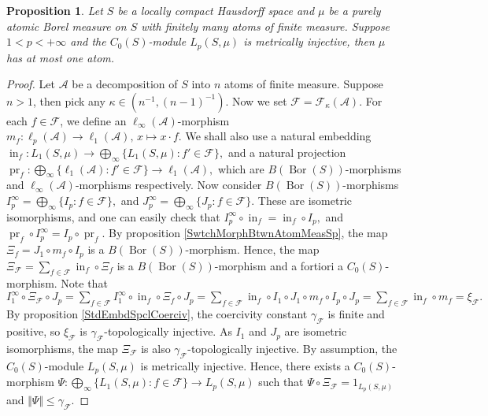 \documentclass[12pt]{article}
\newtheorem{proposition}[theorem]{Proposition}
\begin{document}
\begin{proposition}\label{MetInjC0SModLpSmuOnFinAtmMeasSpCharac}
    Let $S$ be a locally compact Hausdorff space and $\mu$ be a purely atomic 
    Borel measure on $S$ with finitely many atoms of finite measure. 
    Suppose $1<p<+\infty$ and the $C_0(S)$-module $L_p(S,\mu)$ is metrically 
    injective, then $\mu$ has at most one atom.
\end{proposition}
\begin{proof}
    Let $\mathcal{A}$ be a decomposition of $S$ into $n$ atoms of finite 
    measure. Suppose $n>1$, then pick any $\kappa\in(n^{-1}, (n-1)^{-1})$. 
    Now we set $\mathcal{F}=\mathcal{F}_{\kappa}(\mathcal{A})$. For 
    each $f\in \mathcal{F}$, we define an $\ell_\infty(\mathcal{A})$-morphism 
    $
        m_f:
        \ell_p(\mathcal{A})\to\ell_1(\mathcal{A}),\,
        x\mapsto x\cdot f.
    $
    We shall also use a natural embedding 
    $
        \operatorname{in}_f:
        L_1(S,\mu)\to\bigoplus_\infty\{L_1(S,\mu):f'\in\mathcal{F}\},
    $
    and a natural projection
    $
        \operatorname{pr}_f:
        \bigoplus_\infty\{
            \ell_1(\mathcal{A}):f'\in\mathcal{F}
        \}\to\ell_1(\mathcal{A}),
    $
    which are $B(\operatorname{Bor}(S))$-morphisms 
    and $\ell_\infty(\mathcal{A})$-morphisms respectively. 
    Now consider $B(\operatorname{Bor}(S))$-morphisms 
    $
        I_p^\infty=\bigoplus_\infty\{I_p:f\in\mathcal{F}\},
    $
    and
    $
        J_p^\infty=\bigoplus_\infty\{J_p:f\in\mathcal{F}\}.
    $
    These are isometric isomorphisms, and one can easily check that 
    $
        I_p^\infty \circ \operatorname{in}_f=\operatorname{in}_f\circ I_p,
    $
    and
    $
        \operatorname{pr}_f\circ I_p^\infty=I_p\circ \operatorname{pr}_f.
    $
    By proposition \ref{SwtchMorphBtwnAtomMeasSp}, the 
    map $\Xi_f=J_1\circ m_f\circ I_p$ is 
    a $B(\operatorname{Bor}(S))$-morphism. Hence, the map 
    $
        \Xi_{\mathcal{F}}=\sum_{f\in\mathcal{F}}\operatorname{in}_f\circ \Xi_f
    $
    is a $B(\operatorname{Bor}(S))$-morphism and a fortiori a $C_0(S)$-morphism. 
    Note that
    $
        I_1^\infty\circ\Xi_\mathcal{F}\circ J_p
        = \sum_{f\in\mathcal{F}} 
            I_1^\infty\circ\operatorname{in}_f \circ \Xi_f \circ J_p
        = \sum_{f\in\mathcal{F}} 
            \operatorname{in}_f\circ I_1 \circ 
            J_1 \circ m_f \circ I_p \circ J_p
        =\sum_{f\in\mathcal{F}} \operatorname{in}_f\circ m_f 
        =\xi_{\mathcal{F}}.
    $
    By proposition \ref{StdEmbdSpclCoerciv}, the coercivity 
    constant $\gamma_{\mathcal{F}}$ is finite and positive, 
    so $\xi_{\mathcal{F}}$ is $\gamma_{\mathcal{F}}$-topologically injective.
    As $I_1$ and $J_p$ are isometric isomorphisms, the map $\Xi_{\mathcal{F}}$ is
    also $\gamma_{\mathcal{F}}$-topologically injective. By assumption, 
    the $C_0(S)$-module $L_p(S,\mu)$ is metrically injective. Hence, there 
    exists a $C_0(S)$-morphism 
    $
        \Psi:
        \bigoplus_\infty\{ L_1(S,\mu):f\in\mathcal{F}\}\to L_p(S,\mu)
    $
    such that $\Psi\circ \Xi_{\mathcal{F}}=1_{L_p(S,\mu)}$ 
    and $\Vert \Psi\Vert\leq \gamma_{\mathcal{F}}$.


\end{proof}
\end{document}
